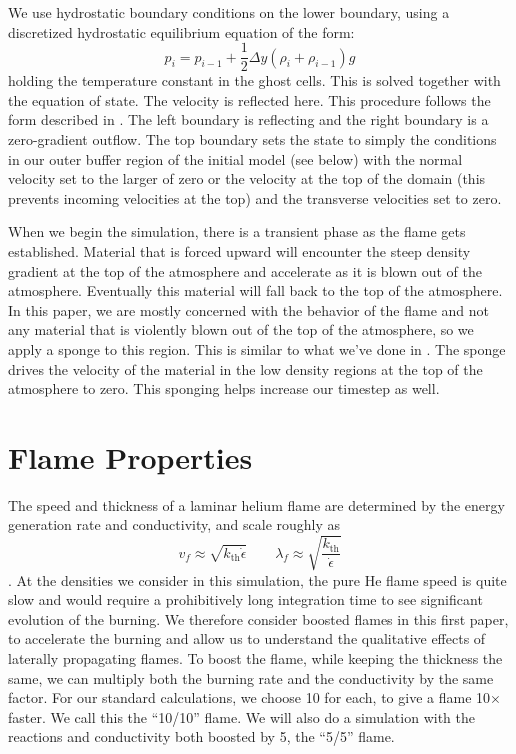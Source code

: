\documentclass[preprint,times,tighten]{aastex63}
\newcommand{\MarginPar}[1]{
    \marginpar{\vskip-\baselineskip%
               \raggedright%
               \tiny\sffamily%
               {\color{red}\hrule%
               \smallskip%
               #1\par%
               \smallskip%
               \hrule}}%
}
\begin{document}
We use hydrostatic boundary conditions on the lower boundary, using
a discretized hydrostatic equilibrium equation of the form:
\begin{equation}
\label{eq:hse}
p_i = p_{i-1} + \frac{1}{2} \Delta y (\rho_i + \rho_{i-1}) g
\end{equation}
holding the temperature constant in the ghost cells.  This is solved
together with the equation of state.  The velocity is reflected here.
This procedure follows the form described in \citet{ppm-hse}.  The
left boundary is reflecting and the right boundary is a zero-gradient
outflow.  The top boundary sets the state to simply the conditions
in our outer buffer region of the initial model (see below) with the
normal velocity set to the larger of zero or the velocity at the top
of the domain (this prevents incoming velocities at the top) and the
transverse velocities set to zero.

When we begin the simulation, there is a transient phase as the flame
gets established.  Material that is forced upward will encounter the
steep density gradient at the top of the atmosphere and accelerate as
it is blown out of the atmosphere.  Eventually this material will fall
back to the top of the atmosphere.  In this paper, we are mostly
concerned with the behavior of the flame and not any material that is
violently blown out of the top of the atmosphere, so we apply a sponge
to this region.  This is similar to what we've done in \cite{xrb3d}.
The sponge drives the velocity of the material in the low
density \MarginPar{add mathematical form of sponge} regions at the top
of the atmosphere to zero.  This sponging helps increase our timestep
as well.




\section{Flame Properties}\label{Sec:Flame}

The speed and thickness of a laminar helium flame are determined by the
energy generation rate and conductivity, and scale roughly as 
\begin{equation}
v_f \approx \sqrt{k_\mathrm{th} \dot{\epsilon}} \qquad
\lambda_f \approx \sqrt{\frac{k_\mathrm{th}}{\dot{\epsilon}}}
\end{equation}
\citep{orourke:1979,khokhlov:1993}.
At the densities we consider in this simulation, the pure He flame
speed is quite slow and would require a prohibitively long integration
time to see significant evolution of the burning.  We therefore
consider boosted flames in this first paper, to accelerate the burning
and allow us to understand the qualitative effects of laterally
propagating flames.  To boost the flame, while keeping the thickness
the same, we can multiply both the burning rate and the conductivity
by the same factor.  For our standard calculations, we choose 10 for
each, to give a flame 10$\times$ faster.  We call this the ``10/10''
flame.  We will also do a simulation with the reactions and
conductivity both boosted by 5, the ``5/5'' flame.
\end{document}
